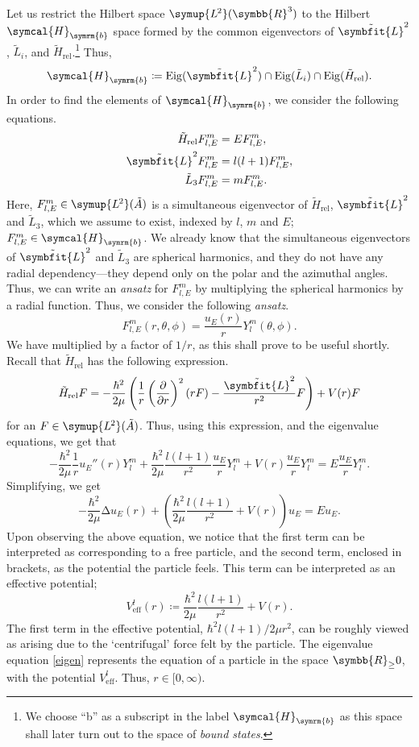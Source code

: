 \documentclass[12pt, a4 paper]{article}
\theoremstyle{definition}
\newcommand{\ltwo}{\symup{L\kern-0.5pt^2}}
\newcommand{\ltworthree}{\ltwo(\rr^3)}
\newcommand{\rr}{\symbb{R}}
\newcommand{\hilbert}{\symcal{H}}
\newcommand{\lap}{∆}
\newcommand{\lvecsquare}{\tilde{\symbfit{L}}^2}
\newcommand{\hrel}{\tilde{H}_\text{rel}}
\newcommand{\lthree}{\tilde{L}_3}
\newcommand{\flme}{F^m_{l,E}}
\newcommand{\bhilbert}{\hilbert_{\symrm{b}}}
\newcommand{\eigen}{\operatorname{Eig}}
\newcommand{\ltwoa}{\ltwo(\tilde{A})}
\newcommand{\sphe}{Y_l^m}
\begin{document}
    Let us restrict the Hilbert space \(\ltworthree\) to the Hilbert \(\bhilbert\) space formed by the common eigenvectors of \(\lvecsquare\), \(\tilde{L}_i\), and \(\hrel\).\footnote{We choose ``b'' as a subscript in the label \(\bhilbert\) as this space shall later turn out to the space of \textit{bound states}.} Thus,
    \[
        \bhilbert \coloneq \eigen(\lvecsquare) \cap \eigen(\tilde{L}_i) \cap \eigen(\hrel).
    \]
    In order to find the elements of \(\bhilbert\), we consider the following equations.
    \begin{align*}
        \hrel \flme &= E \flme,\\
        \lvecsquare \flme &= l(l+1) \flme,\\
        \lthree \flme &= m \flme.
    \end{align*}
    Here, \(\flme \in \ltwoa\) is a simultaneous eigenvector of \(\hrel\), \(\lvecsquare\) and \(\lthree\), which we assume to exist, indexed by \(l\), \(m\) and \(E\); \(\flme \in \bhilbert\). We already know that the simultaneous eigenvectors of \(\lvecsquare\) and \(\lthree\) are spherical harmonics, and they do not have any radial dependency---they depend only on the polar and the azimuthal angles. Thus, we can write an \textit{ansatz} for \(\flme\) by multiplying the spherical harmonics by a radial function. Thus, we consider the following \textit{ansatz}.
    \[
        \flme(r, \theta, \phi) = \frac{u_E(r)}{r}\sphe(\theta, \phi).
    \]
    We have multiplied by a factor of \(1/r\), as this shall prove to be useful shortly. Recall that \(\hrel\) has the following expression.
    \[
        \tilde{H}_\text{rel} F = -\frac{\hbar^2}{2\mu}\left(\frac{1}{r}\left(\frac{\partial}{\partial r}\right)^2 (rF) - \frac{\lvecsquare}{r^2}F\right) + V(r)F
    \]
    for an \(F \in \ltwoa\). Thus, using this expression, and the eigenvalue equations, we get that
    \[
        -\frac{\hbar^2}{2\mu} \frac{1}{r} u_E''(r) \sphe + \frac{\hbar^2}{2\mu} \frac{l(l+1)}{r^2} \frac{u_E}{r} \sphe + V(r) \frac{u_E}{r} \sphe = E \frac{u_E}{r} \sphe.
    \]
    Simplifying, we get
    \[
        -\frac{\hbar^2}{2\mu} \lap u_E(r) + \left(\frac{\hbar^2}{2\mu} \frac{l(l+1)}{r^2} + V(r)\right) u_E = E u_E.\tag{\textasteriskcentered}\label{eigen}
    \]
    Upon observing the above equation, we notice that the first term can be interpreted as corresponding to a free particle, and the second term, enclosed in brackets, as the potential the particle feels. This term can be interpreted as an effective potential;
    \[
        V^l_{\text{eff}} (r) \coloneq \frac{\hbar^2}{2\mu} \frac{l(l+1)}{r^2} + V(r).
    \]
    The first term in the effective potential, \(\hbar^2 l(l+1)/2\mu r^2\), can be roughly viewed as arising due to the `centrifugal' force felt by the particle. The eigenvalue equation \eqref{eigen} represents the equation of a particle in the space \(\rr_{\geq}0\), with the potential \(V^l_{\text{eff}}\). Thus, \(r \in [0, \infty)\).
\end{document}
